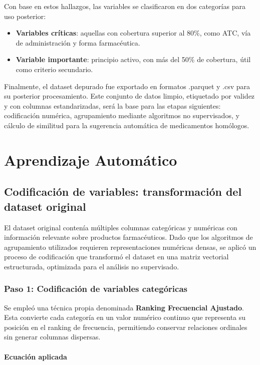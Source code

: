 \documentclass[conference]{IEEEtran}
\begin{document}
Con base en estos hallazgos, las variables se clasificaron en dos categorías para uso posterior:

\begin{itemize}
    \item \textbf{Variables críticas}: aquellas con cobertura superior al 80\%, como ATC, vía de administración y forma farmacéutica.
    \item \textbf{Variable importante}: principio activo, con más del 50\% de cobertura, útil como criterio secundario.
\end{itemize}

Finalmente, el dataset depurado fue exportado en formatos .parquet y .csv para su posterior procesamiento. Este conjunto de datos limpio, etiquetado por validez y con columnas estandarizadas, será la base para las etapas siguientes: codificación numérica, agrupamiento mediante algoritmos no supervisados, y cálculo de similitud para la sugerencia automática de medicamentos homólogos.


\section{Aprendizaje Automático}

\subsection{Codificación de variables: transformación del dataset original}

El dataset original contenía múltiples columnas categóricas y numéricas con información relevante sobre productos farmacéuticos. Dado que los algoritmos de agrupamiento utilizados requieren representaciones numéricas densas, se aplicó un proceso de codificación que transformó el dataset en una matriz vectorial estructurada, optimizada para el análisis no supervisado.

\subsubsection{Paso 1: Codificación de variables categóricas}

Se empleó una técnica propia denominada \textbf{Ranking Frecuencial Ajustado}. Esta convierte cada categoría en un valor numérico continuo que representa su posición en el ranking de frecuencia, permitiendo conservar relaciones ordinales sin generar columnas dispersas.

\paragraph{Ecuación aplicada}
\end{document}
